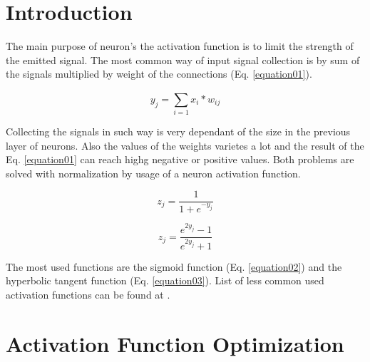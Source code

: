 \documentclass{llncs}
\begin{document}

\section{Introduction}

The main purpose of neuron's the activation function is to limit the strength of the emitted signal. The most common way of input signal collection is by sum of the signals multiplied by weight of the connections (Eq. \ref{equation01}).

\begin{equation}
\label{equation01}
y_{j} = \sum_{i=1}^{} x_{i}*w_{ij}
\end{equation}

Collecting the signals in such way is very dependant of the size in the previous layer of neurons. Also the values of the weights varietes a lot and the result of the Eq. \ref{equation01} can reach highg negative or positive values. Both problems are solved with normalization by usage of a neuron activation function. 

\begin{equation}
\label{equation02}
z_{j} = \frac{1}{1 + e^{-y_{j}}}
\end{equation}

\begin{equation}
\label{equation03}
z_{j} = \frac{e^{2y_{j}}-1}{e^{2y_{j}}+1}
\end{equation}


The most used functions are the sigmoid function (Eq. \ref{equation02}) and the hyperbolic tangent function (Eq. \ref{equation03}). List of less common used activation functions can be found at \cite{wikipedia01}.

\section{Activation Function Optimization}
\end{document}
